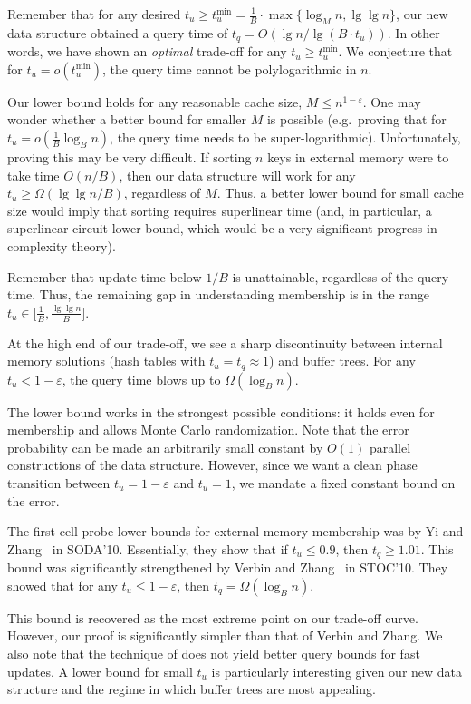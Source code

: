 \documentclass[letterpaper,11pt]{article}
\newcommand{\eps}{\varepsilon}
\begin{document}
Remember that for any desired $t_u \ge t_u^{\min} = \frac{1}{B} \cdot
\max \{ \log_M n, \lg\lg n\}$, our new data structure obtained a query
time of $t_q = O(\lg n / \lg (B\cdot t_u))$. In other words, we have
shown an \emph{optimal} trade-off for any $t_u \ge t_u^{\min}$. We
conjecture that for $t_u = o(t_u^{\min})$, the query time cannot be
polylogarithmic in $n$.

Our lower bound holds for any reasonable cache size, $M \le
n^{1-\eps}$. One may wonder whether a better bound for smaller $M$ is
possible (e.g.~proving that for $t_u = o(\frac{1}{B} \log_B n)$, the
query time needs to be super-logarithmic). Unfortunately, proving this
may be very difficult. If sorting $n$ keys in external memory were to
take time $O(n/B)$, then our data structure will work for any $t_u \ge
\Omega(\lg\lg n / B)$, regardless of $M$. Thus, a better lower bound
for small cache size would imply that sorting requires superlinear
time (and, in particular, a superlinear circuit lower bound, which
would be a very significant progress in complexity theory).

Remember that update time below $1/B$ is unattainable, regardless of
the query time. Thus, the remaining gap in understanding membership is
in the range $t_u \in \big[\frac{1}{B}, \frac{\lg\lg n}{B} \big]$.

At the high end of our trade-off, we see a sharp discontinuity between
internal memory solutions (hash tables with $t_u = t_q \approx 1$) and
buffer trees. For any $t_u < 1-\eps$, the query time blows up to
$\Omega(\log_B n)$.

The lower bound works in the strongest possible conditions: it holds
even for membership and allows Monte Carlo randomization. Note that
the error probability can be made an arbitrarily small constant by
$O(1)$ parallel constructions of the data structure. However, since we
want a clean phase transition between $t_u = 1-\eps$ and $t_u = 1$, we
mandate a fixed constant bound on the error.

The first cell-probe lower bounds for external-memory membership was
by Yi and Zhang~\cite{yi10buffer} in SODA'10. Essentially, they show
that if $t_u \le 0.9$, then $t_q \ge 1.01$. This bound was
significantly strengthened by Verbin and Zhang~\cite{verbin10buffer}
in STOC'10. They showed that for any $t_u \le 1-\eps$, then $t_q =
\Omega(\log_B n)$.

This bound is recovered as the most extreme point on our trade-off
curve. However, our proof is significantly simpler than that of Verbin
and Zhang. We also note that the technique of \cite{verbin10buffer}
does not yield better query bounds for fast updates. A lower bound for
small $t_u$ is particularly interesting given our new data structure
and the regime in which buffer trees are most appealing.
\end{document}
